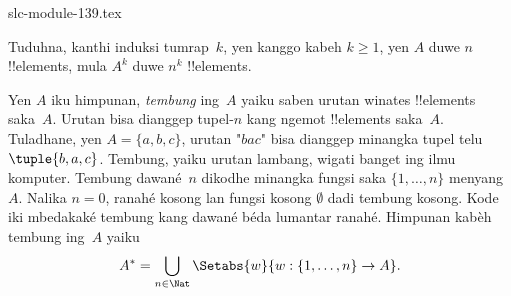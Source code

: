 \begin{filecontents*}[overwrite]{slc-module-139.tex}
\begin{prob}
Tuduhna, kanthi induksi tumrap~$k$, yen kanggo kabeh $k \ge 1$,
yen $A$ duwe $n$ !!{element}s, mula $A^k$ duwe
$n^k$ !!{element}s.
\end{prob}

\begin{ex}
Yen $A$ iku himpunan, \emph{tembung} ing~$A$ yaiku saben
urutan winates !!{element}s saka~$A$. Urutan bisa dianggep
tupel-$n$ kang ngemot !!{element}s saka~$A$.
Tuladhane, yen $A = \{a, b, c\}$, urutan "$bac$" bisa
dianggep minangka tupel telu~$\tuple{b, a, c}$.
Tembung, yaiku urutan lambang, wigati banget ing ilmu komputer.
Tembung dawané~$n$ dikodhe minangka fungsi saka
$\{1,\ldots,n\}$ menyang~$A$. Nalika $n=0$, ranahé kosong
lan fungsi kosong $\emptyset$ dadi tembung kosong. Kode
iki mbedakaké tembung kang dawané béda lumantar ranahé.
Himpunan kabèh tembung ing~$A$ yaiku
\[
A^* = \bigcup_{n\in\Nat} \Setabs{w}{w:\{1,\ldots,n\}\to A}.
\]
\end{ex}


\end{filecontents*}

